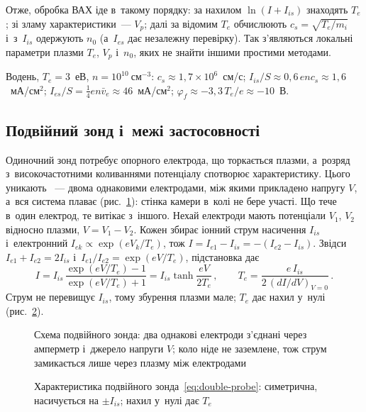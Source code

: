 Отже, обробка ВАХ іде в~такому порядку: за нахилом $\ln(I+I_{is})$ знаходять $T_e$; зі зламу характеристики~--- $V_p$; далі за відомим $T_e$ обчислюють $c_s=\sqrt{T_e/m_i}$ і~з~$I_{is}$ одержують $n_0$ (а~$I_{es}$ дає незалежну перевірку). Так з'являються локальні параметри плазми $T_e$, $V_p$ і~$n_0$, яких не знайти іншими простими методами.

\begin{Estimate}
Водень, $T_e=3$~еВ, $n=10^{10}~\mathrm{см}^{-3}$: $c_s\approx1{,}7\times10^{6}$~см/с;
$I_{is}/S\approx0{,}6\,en c_s\approx1{,}6$~мА/см$^2$; $I_{es}/S=\tfrac14en\bar v_e\approx46$~мА/см$^2$; $\varphi_f\approx-3{,}3\,T_e/e\approx-10$~В.
\end{Estimate}

\subsection*{Подвійний зонд і~межі застосовності}
Одиночний зонд потребує опорного електрода, що торкається плазми, а~розряд з~високочастотними
коливаннями потенціалу спотворює характеристику. Цього уникають ~---
двома однаковими електродами, між якими прикладено напругу $V$, а~вся система плаває
(рис.~\ref{pic:double-probe-circuit}): стінка камери в~колі не бере участі.
Що тече в~один електрод, те витікає з~іншого. Нехай
електроди мають потенціали $V_1$, $V_2$ відносно плазми, $V=V_1-V_2$. Кожен збирає
іонний струм насичення $I_{is}$ і~електронний $I_{ek}\propto\exp(eV_k/T_e)$, тож
$I=I_{e1}-I_{is}=-(I_{e2}-I_{is})$. Звідси $I_{e1}+I_{e2}=2I_{is}$ і~$I_{e1}/I_{e2}=\exp(eV/T_e)$,
підстановка дає
\begin{equation}\label{eq:double-probe}
	I=I_{is}\,\frac{\exp(eV/T_e)-1}{\exp(eV/T_e)+1}=I_{is}\tanh\frac{eV}{2T_e}\,,\qquad
	T_e=\frac{e\,I_{is}}{2\,(dI/dV)_{V=0}}\,.
\end{equation}
Струм не перевищує $I_{is}$, тому збурення плазми мале; $T_e$ дає нахил у~нулі
(рис.~\ref{pic:double-probe}).

\begin{figure}[ht]\centering
	\caption{Схема подвійного зонда: два однакові електроди з'єднані через амперметр і~джерело напруги $V$;
	коло ніде не заземлене, тож струм замикається лише через плазму між електродами}
	\label{pic:double-probe-circuit}
\end{figure}
\begin{figure}[ht]\centering
	\caption{Характеристика подвійного зонда~\eqref{eq:double-probe}: симетрична, насичується на $\pm I_{is}$;
	нахил у~нулі дає $T_e$}
	\label{pic:double-probe}
\end{figure}

